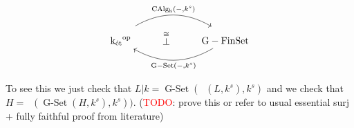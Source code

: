 \documentclass[12pt,a4paper]{article}
\DeclareMathOperator{\CAlgk}{CAlg_k}
\DeclareMathOperator{\kSp}{kSp}
\DeclareMathOperator{\GSet}{G-Set}
\DeclareMathOperator{\GFSet}{G-FinSet}
\DeclareMathOperator{\ket}{k_{\text{ét}}}
\DeclareMathOperator{\op}{op}
\begin{document}
 \[\begin{tikzcd}
	\ket^{\op} & \stackrel{\cong}{\bot} & \GFSet
	\arrow["{\CAlgk(-, k^s)}", shift left=3, bend left, from=1-1, to=1-3]
	\arrow["{\GSet(-, k^s)}", bend left, from=1-3, to=1-1]
\end{tikzcd}\]

To see this we just check that $L|k = \GSet(\CAlgk(L,k^s),k^s)$ and we check that $H = \CAlgk(\GSet(H,k^s),k^s))$. (\textcolor{red}{TODO}: prove this or refer to usual essential surj + fully faithful proof from literature)

 
 
\end{document}
